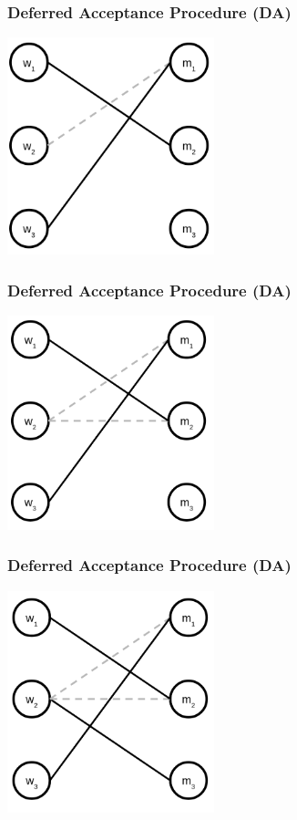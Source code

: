 \begin{frame} 
\frametitle{Deferred Acceptance Procedure (DA)}
\centering
\includegraphics[width=6cm]{img/matching/da3.png}
\end{frame}

\begin{frame} 
\frametitle{Deferred Acceptance Procedure (DA)}
\centering
\includegraphics[width=6cm]{img/matching/da4.png}
\end{frame}

\begin{frame} 
\frametitle{Deferred Acceptance Procedure (DA)}
\centering
\includegraphics[width=6cm]{img/matching/da5.png}
\end{frame}

